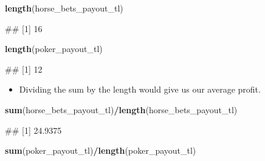 \documentclass[
]{book}
\newenvironment{Shaded}{\begin{snugshade}}{\end{snugshade}}
\newcommand{\FunctionTok}[1]{\textcolor[rgb]{0.13,0.29,0.53}{\textbf{#1}}}
\newcommand{\NormalTok}[1]{#1}
\newcommand{\SpecialCharTok}[1]{\textcolor[rgb]{0.81,0.36,0.00}{\textbf{#1}}}
\providecommand{\tightlist}{%
  \setlength{\itemsep}{0pt}\setlength{\parskip}{0pt}}
\begin{document}
\begin{Shaded}
\begin{Highlighting}[]
\FunctionTok{length}\NormalTok{(horse\_bets\_payout\_tl)}
\end{Highlighting}
\end{Shaded}

\begin{Shaded}
\begin{Highlighting}[]
\NormalTok{\#\# [1] 16}
\end{Highlighting}
\end{Shaded}

\begin{Shaded}
\begin{Highlighting}[]
\FunctionTok{length}\NormalTok{(poker\_payout\_tl)}
\end{Highlighting}
\end{Shaded}

\begin{Shaded}
\begin{Highlighting}[]
\NormalTok{\#\# [1] 12}
\end{Highlighting}
\end{Shaded}

\begin{itemize}
\tightlist
\item
  Dividing the sum by the length would give us our average profit.
\end{itemize}

\begin{Shaded}
\begin{Highlighting}[]
\FunctionTok{sum}\NormalTok{(horse\_bets\_payout\_tl)}\SpecialCharTok{/}\FunctionTok{length}\NormalTok{(horse\_bets\_payout\_tl)}
\end{Highlighting}
\end{Shaded}

\begin{Shaded}
\begin{Highlighting}[]
\NormalTok{\#\# [1] 24.9375}
\end{Highlighting}
\end{Shaded}

\begin{Shaded}
\begin{Highlighting}[]
\FunctionTok{sum}\NormalTok{(poker\_payout\_tl)}\SpecialCharTok{/}\FunctionTok{length}\NormalTok{(poker\_payout\_tl)}
\end{Highlighting}
\end{Shaded}
\end{document}
